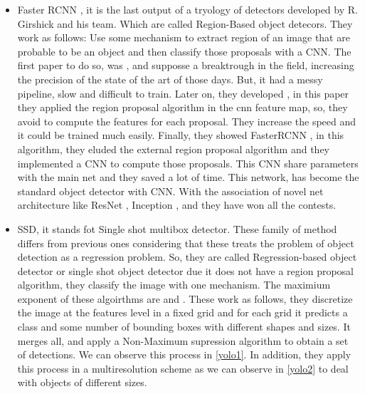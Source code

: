 \documentclass[12pt, a4paper, titlepage,twoside,openright]{article}
\begin{document}
\begin{itemize}

\item Faster RCNN \cite{fasterrcnn}, it is the last output of a tryology of detectors developed by R. Girshick and his team. Which are called Region-Based object detecors. They work as follows: Use some mechanism to extract region of an image that are probable to be an object and then classify those proposals with a CNN. The first paper to do so, was \cite{rcnn}, and supposse a breaktrough in the field, increasing the precision of the state of the art of those days. But, it had a messy pipeline, slow and difficult to train. Later on, they developed \cite{fastrcnn}, in this paper they applied the region proposal algorithm in the cnn feature map, so, they avoid to compute the features for each proposal. They increase the speed and it could be trained much easily. Finally, they showed FasterRCNN \cite{fasterrcnn}, in this algorithm, they eluded the external region proposal algorithm and they implemented a CNN to compute those proposals. This CNN share parameters with the main net and they saved a lot of time. This network, has become the standard object detector with CNN. With the association of novel net architecture like ResNet \cite{resnet}, Inception \cite{inception}, and \cite{pvanet} they have won all the contests.


\item SSD, it stands fot Single shot multibox detector. These family of method differs from previous ones considering that these treats the problem of object detection as a regression problem. So, they are called Regression-based object detector or single shot object detector due it does not have a region proposal algorithm, they classify the image with one mechanism. The maximium exponent of these algoirthms are \cite{yolo} and \cite{ssd}. These work as follows, they discretize the image at the features level in a fixed grid and for each grid it predicts a class and some number of bounding boxes with different shapes and sizes. It merges all, and apply a Non-Maximum supression algorithm to obtain a set of detections. We can observe this process in \ref{yolo1}. In addition, they apply this process in a multiresolution scheme as we can observe in \ref{yolo2} to deal with objects of different sizes.



\end{itemize}
\end{document}
